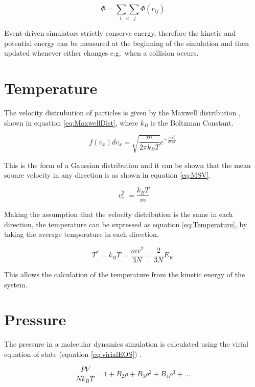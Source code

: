 \documentclass[12pt]{UoAthesis}
\begin{document}
\begin{equation}
  \label{eq:totalU}
  \Phi = \underset{i\;\;<\;\;j}{\sum\sum}\Phi(r_{ij})
\end{equation}

Event-driven simulators strictly conserve energy, therefore the
kinetic and potential energy can be measured at the beginning of the
simulation and then updated whenever either changes e.g.\ when a
collision occurs.

\section{Temperature}

The velocity distrubution of particles is given by the Maxwell
distribution \cite{Haile1997}, shown in equation
\eqref{eq:MaxwellDist}, where $k_B$ is the Boltzman Constant.

\begin{equation}
  \label{eq:MaxwellDist}
  f(v_x)dv_x = \sqrt{\frac{m}{2\pi k_BT}}e^{-\frac{mv_x^2}{2k_BT}} 
\end{equation}

This is the form of a Gaussian distribution and it can be shown
\cite{Landau1968} that the mean square velocity in any direction is as
shown in equation \eqref{eq:MSV}.

\begin{equation}
  \label{eq:MSV}
  \bar{\;v_x^2\;} = \frac{k_BT}{m}
\end{equation}

Making the assumption that the velocity distribution is the same in
each direction, the temperature can be expressed as equation
\eqref{eq:Temperature}, by taking the average temperature in each
direction. 

\begin{equation}
\label{eq:Temperature}
  T^* = k_BT = \frac{mv^2}{3N} = \frac{2}{3N}E_K
\end{equation}

This allows the calculation of the temperature from the kinetic energy
of the system.
\section{Pressure \label{sec:Pressure}}

The pressure in a molecular dynamics simulation is calculated using
the virial equation of state (equation \eqref{eq:virialEOS})
\cite{Landau1968}.

\begin{equation}
  \label{eq:virialEOS}
  \frac{PV}{Nk_BT} = 1 + B_2\rho + B_3\rho^2 + B_4\rho^3 + ...
\end{equation}
\end{document}
